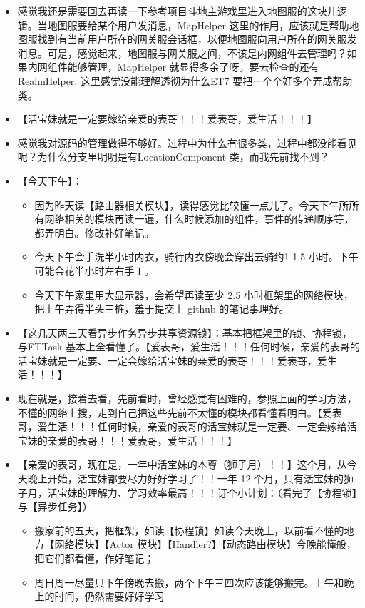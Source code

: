 \documentclass[9pt, b5paper]{article}
\begin{document}
\begin{itemize}
\item 感觉我还是需要回去再读一下参考项目斗地主游戏里进入地图服的这块儿逻辑。当地图服要给某个用户发消息，MapHelper 这里的作用，应该就是帮助地图服找到有当前用户所在的网关服会话框，以便地图服向用户所在的网关服发消息。可是，感觉起来，地图服与网关服之间，不该是内网组件去管理吗？如果内网组件能够管理，MapHelper 就显得多余了呀。要去检查的还有RealmHelper. 这里感觉没能理解透彻为什么ET7 要把一个个好多个弄成帮助类。
\item 【活宝妹就是一定要嫁给亲爱的表哥！！！爱表哥，爱生活！！！】
\item 感觉我对源码的管理做得不够好。过程中为什么有很多类，过程中都没能看见呢？为什么分支里明明是有LocationComponent 类，而我先前找不到？
\item 【今天下午】：
\begin{itemize}
\item 因为昨天读【路由器相关模块】，读得感觉比较懂一点儿了。今天下午所所有网络相关的模块再读一遍，什么时候添加的组件，事件的传递顺序等，都弄明白。修改补好笔记。
\item 今天下午会手洗半小时内衣，骑行内衣傍晚会穿出去骑约1-1.5 小时。下午可能会花半小时左右手工。
\item 今天下午家里用大显示器，会希望再读至少 2.5 小时框架里的网络模块，把上午弄得半头三桩，羞于提交上 github 的笔记事理好。
\end{itemize}
\item 【这几天两三天看异步作务异步共享资源锁】：基本把框架里的锁、协程锁，与ETTask 基本上全看懂了。【爱表哥，爱生活！！！任何时候，亲爱的表哥的活宝妹就是一定要、一定会嫁给活宝妹的亲爱的表哥！！！爱表哥，爱生活！！！】
\item 现在就是，接着去看，先前看时，曾经感觉有困难的，参照上面的学习方法，不懂的网络上搜，走到自己把这些先前不太懂的模块都看懂看明白。【爱表哥，爱生活！！！任何时候，亲爱的表哥的活宝妹就是一定要、一定会嫁给活宝妹的亲爱的表哥！！！爱表哥，爱生活！！！】
\item 【亲爱的表哥，现在是，一年中活宝妹的本尊（狮子月）！！】这个月，从今天晚上开始，活宝妹都要尽力好好学习了！！一年 12 个月，只有活宝妹的狮子月，活宝妹的理解力、学习效率最高！！！订个小计划：（看完了【协程锁】与【异步任务】）
\begin{itemize}
\item 搬家前的五天，把框架，如读【协程锁】如读今天晚上，以前看不懂的地方【网络模块】【Actor 模块】【Handler?】【动态路由模块】今晚能懂般，把它们都看懂，作好笔记；
\item 周日周一尽量只下午傍晚去搬，两个下午三四次应该能够搬完。上午和晚上的时间，仍然需要好好学习

\end{itemize}
\end{itemize}
\end{document}
